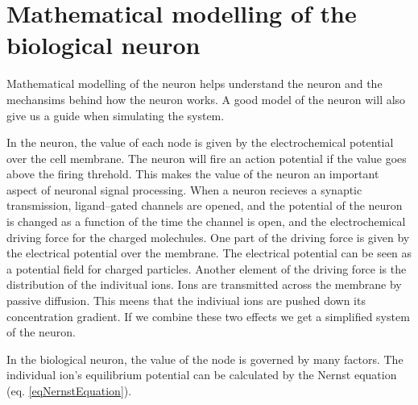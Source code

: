 
% 
% 
%

\section{Mathematical modelling of the biological neuron} 
\label{secMatematiskModelleringAvBioNeuron}


Mathematical modelling of the neuron helps understand the neuron and the mechansims behind how the neuron works.
A good model of the neuron will also give us a guide when simulating the system.

In the neuron, the value of each node is given by the electrochemical potential over the cell membrane. 
The neuron will fire an action potential if the value goes above the firing threhold. This makes the value of the neuron an important aspect of neuronal signal processing.
When a neuron recieves a synaptic transmission, ligand--gated channels are opened, and the potential of the neuron is changed as a function of the time the channel is open, and the electrochemical driving force for the charged molechules.
One part of the driving force is given by the electrical potential over the membrane. %
The electrical potential can be seen as a potential field for charged particles.
Another element of the driving force is the distribution of the indivitual ions. Ions are transmitted across the membrane by passive diffusion. 
This meens that the indiviual ions are pushed down its concentration gradient.
If we combine these two effects we get a simplified system of the neuron.

In the biological neuron, the value of the node is governed by many factors. 
The individual ion's equilibrium potential can be calculated by the Nernst equation (eq. \ref{eqNernstEquation}).


